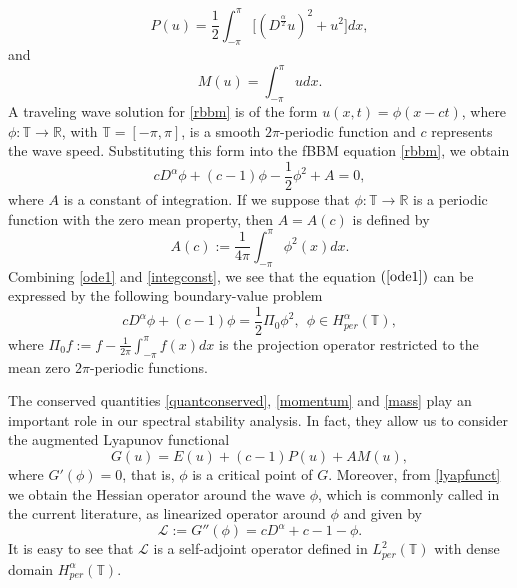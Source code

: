 \documentclass[12pt,reqno]{amsart}
\newcommand{\2}{L^2_{per}(0, T)}
\numberwithin{equation}{section}
\numberwithin{figure}{section}
\begin{document}
		\begin{equation}\label{momentum}
	\displaystyle P(u) = \frac{1}{2}\int_{-\pi}^{\pi} \big[ (D^{\frac{\alpha}{2}}u)^2 +u^2\big]dx,
	\end{equation}
and
	\begin{equation}\label{mass}
	\displaystyle M(u)= \int_{-\pi}^{\pi} u dx.
	\end{equation}
\indent A traveling wave solution for \eqref{rbbm} is of the form $u(x,t)= \phi(x- ct)$, where $\phi:\mathbb{T} \rightarrow \mathbb{R}$, with $\mathbb{T}= [-\pi, \pi]$, is a smooth $2\pi$-periodic function and $c$ represents the wave speed. Substituting this form into the fBBM equation \eqref{rbbm}, we obtain
	\begin{equation}\label{ode1}
	cD^{\alpha}\phi + (c-1)\phi -\frac{1}{2}\phi^2 +A =0,
	\end{equation}
where $A$ is a constant of integration. If we suppose that $\phi:\mathbb{T} \rightarrow \mathbb{R}$ is a periodic function with the zero mean property, then $A = A(c)$ is defined by
	\begin{equation}\label{integconst}
	\displaystyle A(c) :=  \frac{1}{4\pi}\int_{-\pi}^{\pi} \phi^2(x) dx.
	\end{equation}
Combining  \eqref{ode1} and \eqref{integconst}, we see that the equation $(\ref{ode1})$ can be expressed by the following boundary-value problem
	\begin{equation}\label{ode2}
	cD^{\alpha}\phi + (c-1)\phi =\frac{1}{2}\Pi_0\phi^2, \ \ \phi \in H^{\alpha}_{per}(\mathbb{T}),
	\end{equation}
where $\Pi_0 f := f- \frac{1}{2\pi}\int_{-\pi}^{\pi} f(x) dx$ is the projection operator restricted to the mean zero $2\pi$-periodic functions.


The conserved quantities \eqref{quantconserved}, \eqref{momentum} and \eqref{mass} play an important role in our spectral stability analysis. In fact, they allow us to consider the augmented Lyapunov functional
	\begin{equation}\label{lyapfunct}
	G(u)= E(u) + (c-1)P(u) + AM(u),
	\end{equation}
where $G'(\phi)=0$, that is, $\phi$ is a critical point of $G$. Moreover, from \eqref{lyapfunct} we obtain the Hessian operator around the wave $\phi$, which is commonly called in the current literature, as linearized operator around $\phi$ and given by
	\begin{equation}\label{operator}
	\mathcal{L}:= G''(\phi) = cD^{\alpha} + c - 1 - \phi.
	\end{equation}
It is easy to see that $\mathcal{L}$ is a self-adjoint operator defined in $L^2_{per}(\mathbb{T})$ with dense domain $H_{per}^{\alpha}(\mathbb{T})$.
\end{document}
